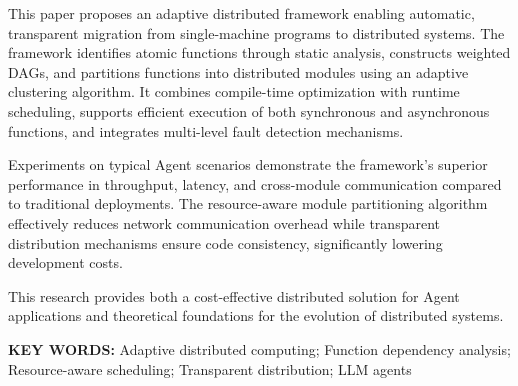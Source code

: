 \noindent
This paper proposes an adaptive distributed framework enabling automatic, transparent migration from single-machine programs to distributed systems. The framework identifies atomic functions through static analysis, constructs weighted DAGs, and partitions functions into distributed modules using an adaptive clustering algorithm. It combines compile-time optimization with runtime scheduling, supports efficient execution of both synchronous and asynchronous functions, and integrates multi-level fault detection mechanisms.
\vspace{\baselineskip}
  
\noindent
Experiments on typical Agent scenarios demonstrate the framework's superior performance in throughput, latency, and cross-module communication compared to traditional deployments. The resource-aware module partitioning algorithm effectively reduces network communication overhead while transparent distribution mechanisms ensure code consistency, significantly lowering development costs.
\vspace{\baselineskip}
  
\noindent
This research provides both a cost-effective distributed solution for Agent applications and theoretical foundations for the evolution of distributed systems.
\vspace{\baselineskip}

\noindent
\textbf{KEY WORDS:} Adaptive distributed computing; Function dependency analysis; Resource-aware scheduling; Transparent distribution; LLM agents